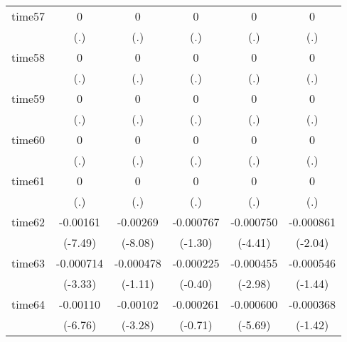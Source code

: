 \begin{table}[htbp]
\begin{tabular}{l*{5}{c}}
time57      &           0         &           0         &           0         &           0         &           0         \\
            &         (.)         &         (.)         &         (.)         &         (.)         &         (.)         \\
time58      &           0         &           0         &           0         &           0         &           0         \\
            &         (.)         &         (.)         &         (.)         &         (.)         &         (.)         \\
time59      &           0         &           0         &           0         &           0         &           0         \\
            &         (.)         &         (.)         &         (.)         &         (.)         &         (.)         \\
time60      &           0         &           0         &           0         &           0         &           0         \\
            &         (.)         &         (.)         &         (.)         &         (.)         &         (.)         \\
time61      &           0         &           0         &           0         &           0         &           0         \\
            &         (.)         &         (.)         &         (.)         &         (.)         &         (.)         \\
time62      &    -0.00161\sym{***}&    -0.00269\sym{***}&   -0.000767         &   -0.000750\sym{***}&   -0.000861\sym{*}  \\
            &     (-7.49)         &     (-8.08)         &     (-1.30)         &     (-4.41)         &     (-2.04)         \\
time63      &   -0.000714\sym{***}&   -0.000478         &   -0.000225         &   -0.000455\sym{**} &   -0.000546         \\
            &     (-3.33)         &     (-1.11)         &     (-0.40)         &     (-2.98)         &     (-1.44)         \\
time64      &    -0.00110\sym{***}&    -0.00102\sym{**} &   -0.000261         &   -0.000600\sym{***}&   -0.000368         \\
            &     (-6.76)         &     (-3.28)         &     (-0.71)         &     (-5.69)         &     (-1.42)         \\

\end{tabular}
\end{table}

